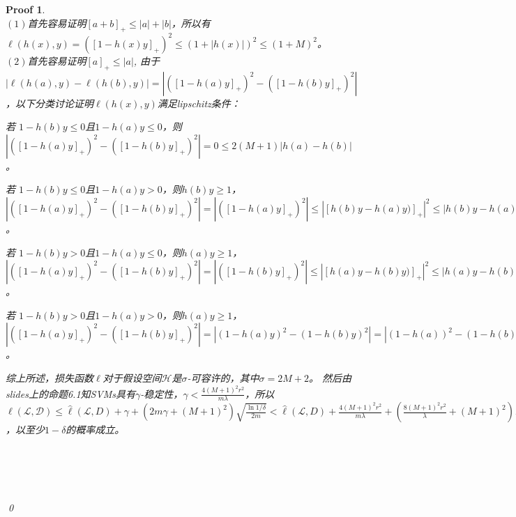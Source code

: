 \documentclass[a4paper,UTF8]{article}
\numberwithin{equation}{section}
\newtheorem*{myProof}{Proof}
\begin{document}
	\begin{myProof}~\\
$(1)$首先容易证明$[a+b]_+ \le |a| + |b|$，所以有$\ell(h(x), y) = ([1 - h(x)y]_+)^2 \le (1 + |h(x)|)^2 \le (1 + M)^2$。
~\\
$(2)$首先容易证明$[a]_+ \le |a|$, 由于$|\ell(h(a), y) - \ell(h(b), y)| = | ([1 - h(a)y]_+)^2 - ([1 - h(b)y]_+)^2 | $
，以下分类讨论证明$\ell(h(x), y)$满足lipschitz条件：

若 $1 - h(b)y \le 0$且$1 - h(a)y \le 0$，则$| ([1 - h(a)y]_+)^2 - ([1 - h(b)y]_+)^2 | = 0 \le 2(M+1)|h(a) - h(b)|$。

若 $1 - h(b)y \le 0$且$1 - h(a)y > 0$，则$h(b)y \ge 1$，$| ([1 - h(a)y]_+)^2 - ([1 - h(b)y]_+)^2 | = |([1 - h(a)y]_+)^2| \le |[h(b)y - h(a)y)]_+|^2 \le |h(b)y - h(a)y|^2 = |h(b)-h(a)||h(b)-h(a)|y^2 \le 2M|h(a) - h(b)| < 2(M+1)|h(a) - h(b)|$。

若 $1 - h(b)y > 0$且$1 - h(a)y \le 0$，则$h(a)y \ge 1$，$| ([1 - h(a)y]_+)^2 - ([1 - h(b)y]_+)^2 | = |([1 - h(b)y]_+)^2| \le |[h(a)y - h(b)y)]_+|^2 \le |h(a)y - h(b)y|^2 = |h(a)-h(b)||h(a)-h(b)|y^2 \le 2M|h(a) - h(b)| < 2(M+1)|h(a) - h(b)|$。

若 $1 - h(b)y > 0$且$1 - h(a)y > 0$，则$h(a)y \ge 1$，$| ([1 - h(a)y]_+)^2 - ([1 - h(b)y]_+)^2 | = | (1 - h(a)y)^2 - (1 - h(b)y)^2 | = | (1-h(a))^2 - (1 - h(b))^2 | = |2 - h(a) - h(b)||h(b)-h(a)| \le (2 + M + M)|h(a) - h(b)| = 2(M+1)|h(a) - h(b)|$。

综上所述，损失函数$\ell$对于假设空间$\mathcal{H}$是$\sigma$-可容许的，其中$\sigma=2M+2$。
然后由slides上的命题6.1知SVMs具有$\gamma$-稳定性，$\gamma < \frac{4(M+1)^2r^2}{m\lambda}$，所以$\ell(\mathcal{L, D}) \le \hat{\ell}(\mathcal{L}, D) + \gamma + (2m\gamma + (M+1)^2) \sqrt{\frac{\ln 1/\delta}{2m}} < \hat{\ell}(\mathcal{L}, D) + \frac{4(M+1)^2r^2}{m\lambda} + (\frac{8(M+1)^2r^2}{\lambda} + (M+1)^2) \sqrt{\frac{\ln 1/\delta}{2m}}$，以至少$1 - \delta$的概率成立。
		

	~\\
	~\\
	~\\
	~\\
	\qed
	\end{myProof}
	
\end{document}
